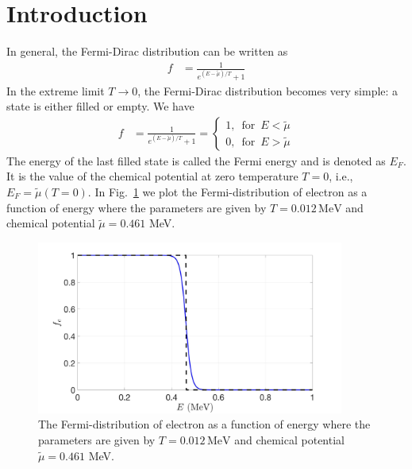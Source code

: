 \documentclass[sn-mathphys,Numbered]{sn-jnl}
\theoremstyle{thmstyleone}%
\theoremstyle{thmstyletwo}%
\theoremstyle{thmstylethree}%
\begin{document}
\maketitle

\section{Introduction}\label{sec1}

In general, the Fermi-Dirac distribution can be written as
\begin{align}
\label{Fermi_exact}
f&=\frac{1}{e^{(E-\tilde{\mu})/T}+1}
\end{align}
In the extreme limit $T\rightarrow0$, the Fermi-Dirac distribution becomes very simple: a state is either filled or empty. We have
\begin{align}
f&=\frac{1}{e^{(E-\tilde{\mu})/T}+1}=\left\{\begin{array}{c}1,\,\,\,\mathrm{for}\,\,\,{E}<\tilde{\mu} \\0,\,\,\,\mathrm{for}\,\,\, {E}>\tilde{\mu}\end{array}\right.
\end{align}
The energy of the last filled state is called the Fermi energy and is denoted as $E_F$. It is the value of the chemical potential at zero temperature $T=0$, i.e., $E_F=\tilde\mu(T = 0)$. In Fig.~\ref{Electron_001} we plot the Fermi-distribution of electron as a function of energy where the parameters are given by $T=0.012\,\mathrm{MeV}$ and chemical potential $\tilde\mu=0.461$ MeV.

\begin{figure}[h]
\begin{center}
\includegraphics[width=0.9\textwidth]{./plot/Electron_distribution001}
\caption{The Fermi-distribution of electron as a function of energy where the parameters are given by $T=0.012\,\mathrm{MeV}$ and chemical potential $\tilde\mu=0.461$ MeV.}
\label{Electron_001}
\end{center}
\end{figure}
\end{document}
